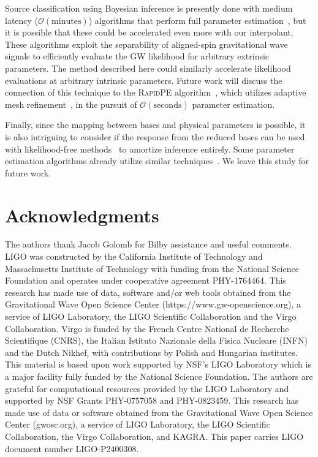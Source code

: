 \documentclass[twocolumn,prd,superscriptaddress,nofootinbib]{revtex4-1}
\newcommand{\dcc}{LIGO-P}
\begin{document}
Source classification using Bayesian inference is presently done with
medium latency ($\mathcal{O}(\mathrm{minutes})$) algorithms that perform
full parameter estimation~\cite{Rose:2022axr,Morisaki:2023kuq}, but it is
possible that these could be accelerated even more with our interpolant.
These algorithms exploit the separability of aligned-spin gravitational
wave signals to efficiently evaluate the GW likelihood for arbitrary extrinsic
parameters. The method described here could similarly accelerate likelihood
evaluations at arbitrary intrinsic parameters. Future work will discuss the
connection of this technique to the \textsc{RapidPE}
algorithm~\cite{Rose:2022axr,Pankow:2015cra}, which utilizes
adaptive mesh refinement~\cite{1989JCoPh..82...64B}, in the pursuit of
$\mathcal{O}(\mathrm{seconds})$ parameter estimation.

Finally, since the mapping between bases and physical parameters is possible,
it is also intriguing to consider if the response from the reduced bases can be
used with likelihood-free methods~\cite{tejero-cantero2020sbi} to amortize
inference entirely. Some parameter estimation algorithms already utilize
similar techniques~\cite{Dax:2021tsq,Chatterjee:2024pbj}. We leave this study
for future work.

\section*{Acknowledgments}

The authors thank Jacob Golomb for Bilby assistance and useful comments.
%
LIGO was constructed by the California Institute of Technology and
Massachusetts Institute of Technology with funding from the National Science
Foundation and operates under cooperative agreement PHY-1764464.
%
This research has made use of data, software and/or web tools obtained from the
Gravitational Wave Open Science Center (https://www.gw-openscience.org), a
service of LIGO Laboratory, the LIGO Scientific Collaboration and the Virgo
Collaboration.  Virgo is funded by the French Centre National de Recherche
Scientifique (CNRS), the Italian Istituto Nazionale della Fisica Nucleare
(INFN) and the Dutch Nikhef, with contributions by Polish and Hungarian
institutes.
%
This material is based upon work supported by NSF's LIGO Laboratory which is a
major facility fully funded by the National Science Foundation.
%
The authors are grateful for computational resources provided by the LIGO
Laboratory and supported by NSF Grants PHY-0757058 and PHY-0823459.
%
This research has made use of data or software obtained from the Gravitational
Wave Open Science Center (gwosc.org), a service of LIGO Laboratory, the LIGO
Scientific Collaboration, the Virgo Collaboration, and KAGRA. 
This paper carries LIGO document number \dcc{2400308}.

\clearpage

\end{document}
